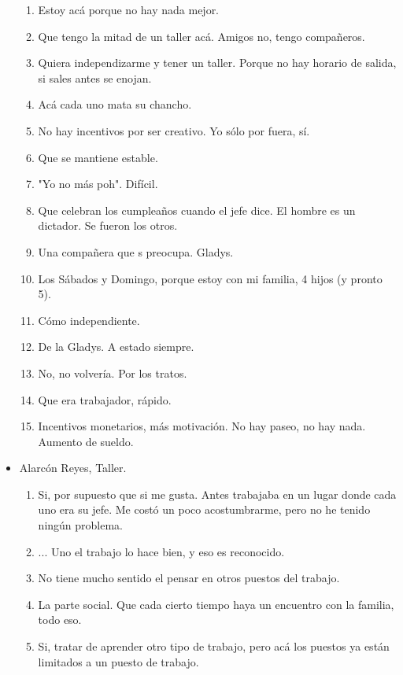 \begin{itemize}
    \begin{enumerate}
        \item Estoy acá porque no hay nada mejor.
        \item Que tengo la mitad de un taller acá. Amigos no, tengo
        compañeros.
        \item Quiera independizarme y tener un taller. Porque no hay horario
        de salida, si sales antes se enojan.
        \item Acá cada uno mata su chancho.
        \item No hay incentivos por ser creativo. Yo sólo por
        fuera, sí.
        \item Que se mantiene estable.
        \item "Yo no más poh". Difícil.
        \item Que celebran los cumpleaños cuando el jefe dice. El
        hombre es un dictador. Se fueron los otros.
        \item Una compañera que s preocupa. Gladys.
        \item Los Sábados y Domingo, porque estoy con mi familia, 4 hijos (y
        pronto 5).
        \item Cómo independiente.
        \item De la Gladys. A estado siempre.
        \item No, no volvería. Por los tratos.
        \item Que era trabajador, rápido.
        \item Incentivos monetarios, más motivación. No hay paseo, no hay
        nada. Aumento de sueldo.
    \end{enumerate}
    \item Alarcón Reyes, Taller.
    \begin{enumerate}
        \item Si, por supuesto que si me gusta. Antes trabajaba en un lugar
        donde cada uno era su jefe. Me costó un poco acostumbrarme, pero no he
        tenido ningún problema.
        \item ... Uno el trabajo lo hace bien, y eso es reconocido.
        \item No tiene mucho sentido el pensar en otros puestos del trabajo.
        \item La parte social. Que cada cierto tiempo haya un encuentro con la
        familia, todo eso.
        \item Si, tratar de aprender otro tipo de trabajo, pero acá los
        puestos ya están limitados a un puesto de trabajo.

\end{enumerate}
\end{itemize}
